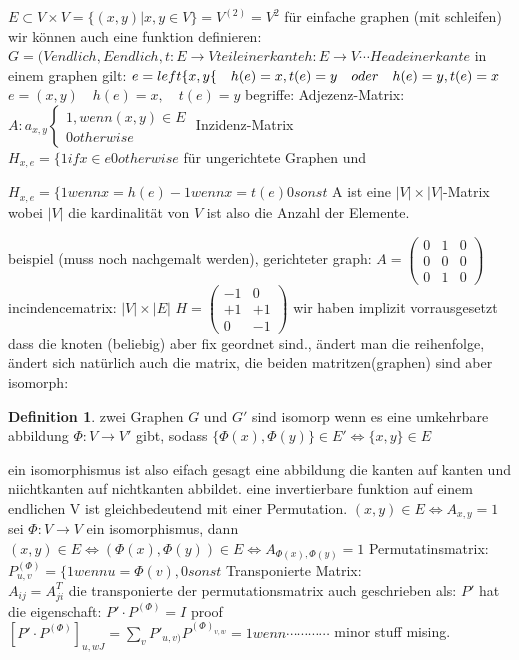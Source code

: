 \documentclass[a4paper]{article}
\theoremstyle{definition}
\newtheorem{definition}{Definition}
\theoremstyle{remark}
\begin{document}
$E\subset V\times V= \{(x,y)|x,y\in V\}= V^{(2)}=V^2$
für einfache graphen (mit schleifen)
wir können auch eine funktion definieren:
$G=(V endlich, E endlich, t: E\rightarrow V teil einer kante
  h:E\rightarrow V \cdots Head einer kante$
  in einem graphen gilt:
  $e=\\left\{ x,y \{ \quad h(e)=x, t(e)=y\quad oder \quad h(e)=y, t(e)=x$
  $e=(x,y)\quad h(e)=x, \quad t(e)=y$
begriffe:
Adjezenz-Matrix:\\
$A: a_{x,y}
\begin{cases}
 	1, wenn (x,y)\in E\\
	0 otherwise
\end{cases}
$
Inzidenz-Matrix\\
$H_{x,e}= \{ 1 if x\in e
  		0 otherwise
		$
für ungerichtete Graphen und 

$H_{x,e}=\{ 1 wenn x=h(e)
  		-1 wenn x=t(e)
		0 sonst$
A ist eine $|V|\times|V|$-Matrix
wobei $|V|$ die kardinalität von $V$ ist also die Anzahl der Elemente.

beispiel (muss noch nachgemalt werden), gerichteter graph:
  $A= \begin{pmatrix}
  0&1&0\\0&0&0\\0&1&0
  \end{pmatrix}
$
incindencematrix: $|V|\times|E|$
$H= \begin{pmatrix}
-1&0\\+1&+1\\0&-1
\end{pmatrix}$
wir haben implizit vorrausgesetzt dass die knoten (beliebig) aber fix geordnet sind., ändert man die reihenfolge, ändert sich natürlich auch die matrix, die beiden matritzen(graphen) sind aber isomorph:\\
\begin{definition}
  
  zwei Graphen $G$ und $G'$ sind isomorp wenn es eine umkehrbare abbildung $\Phi:V\rightarrow V'$ gibt, sodass $\{\Phi (x),\Phi (y)\}\in E' \Leftrightarrow \{x,y\} \in E $
\end{definition}
ein isomorphismus ist also eifach gesagt eine abbildung die kanten auf kanten und niichtkanten auf nichtkanten abbildet.
eine invertierbare funktion auf einem endlichen V ist gleichbedeutend mit einer Permutation.
$(x,y)\in E \Leftrightarrow A_{x,y}=1$
sei $\Phi:V\rightarrow V$ ein isomorphismus, dann\\
$(x,y)\in E \Leftrightarrow (\Phi (x),\Phi (y))\in E \Leftrightarrow A_{\Phi (x),\Phi (y)}=1$
Permutatinsmatrix:
$P^{(\Phi )}_{u,v}=\{ 1 wenn u=\Phi (v), 0 sonst$
Transponierte Matrix:\\
$A_{ij}=A^{T}_{ji}$
die transponierte der permutationsmatrix auch geschrieben als: 
$P'$ hat die eigenschaft:
$P'\cdot P^{(\Phi )}=I$ 
proof\\
$[P'\cdot P^{(\Phi )}]_{u,wJ}= \sum_{v} P'_{u,v)}P^{(\Phi )_{v,w}}= 1 wenn \cdots\cdots\cdots\cdots$
minor stuff mising.
\end{document}
